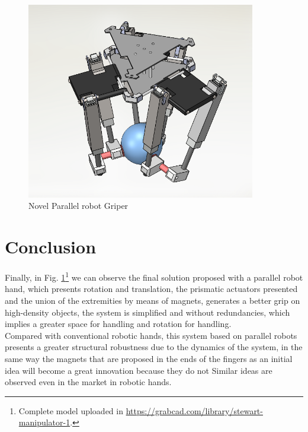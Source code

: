 \documentclass[12pt, twoside]{report}
\begin{document}
\begin{figure}[H]
    \centering
    \includegraphics[width=100mm,scale=0.6]{images/Project4/stewart_gripper.png}
    \caption{Novel Parallel robot Griper}
    \label{fig:Parallel}
\end{figure}


\section{Conclusion}
Finally, in Fig. \ref{fig:Parallel}\footnote{Complete model uploaded in \url{https://grabcad.com/library/stewart-manipulator-1}.}  we can observe the final solution proposed with a parallel robot hand, which presents rotation and translation, the prismatic actuators presented and the union of the extremities by means of magnets, generates a better grip on high-density objects, the system is simplified and without redundancies, which implies a greater space for handling and rotation for handling.\\
Compared with conventional robotic hands, this system based on parallel robots presents a greater structural robustness due to the dynamics of the system, in the same way the magnets that are proposed in the ends of the fingers as an initial idea will become a great innovation because they do not Similar ideas are observed even in the market in robotic hands.
\end{document}
